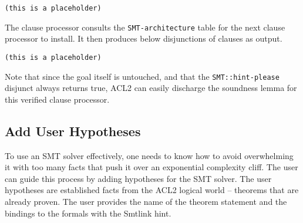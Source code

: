 \begin{lstlisting}[style=codestyle,language=LISP]
(this is a placeholder)
\end{lstlisting}

The clause processor consults the \texttt{SMT-architecture} table for the next
clause processor to install. It then produces below disjunctions of clauses as
output.

\begin{lstlisting}[style=codestyle,language=LISP]
  (this is a placeholder)
\end{lstlisting}

Note that since the goal itself is untouched, and that the
\texttt{SMT::hint-please} disjunct always returns true, ACL2 can easily
discharge the soundness lemma for this verified clause processor.

\subsection{Add User Hypotheses}

To use an \acs{SMT} solver effectively, one needs to know how to avoid
overwhelming it with too many facts that push it over an exponential complexity
cliff. The user can guide this process by adding hypotheses for the \acs{SMT}
solver. The user hypotheses are established facts from the ACL2 logical world --
theorems that are already proven. The user provides the name of the theorem
statement and the bindings to the formals with the Smtlink hint.

